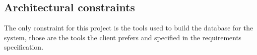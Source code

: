 \documentclass[11pt,titlepage]{article} %
\begin{document}

\subsection{Architectural constraints}
The only constraint for this project is the tools used to build the database for the system, those are the tools the client prefers and specified in the requirements specification.



\end{document}
